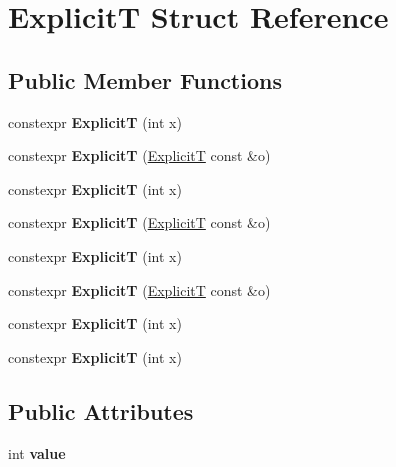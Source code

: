 \hypertarget{struct_explicit_t}{}\section{ExplicitT Struct Reference}
\label{struct_explicit_t}
\subsection*{Public Member Functions}
\begin{DoxyCompactItemize}
\item 
\mbox{\label{struct_explicit_t_a8ebac351427b4b31f50afc5a846a439c}} 
constexpr {\bfseries ExplicitT} (int x)
\item 
\mbox{\label{struct_explicit_t_a9fddccd372d6f78b51484d7e985901f4}} 
constexpr {\bfseries ExplicitT} (\mbox{\hyperlink{struct_explicit_t}{ExplicitT}} const \&o)
\item 
\mbox{\label{struct_explicit_t_a8ebac351427b4b31f50afc5a846a439c}} 
constexpr {\bfseries ExplicitT} (int x)
\item 
\mbox{\label{struct_explicit_t_a9fddccd372d6f78b51484d7e985901f4}} 
constexpr {\bfseries ExplicitT} (\mbox{\hyperlink{struct_explicit_t}{ExplicitT}} const \&o)
\item 
\mbox{\label{struct_explicit_t_a8ebac351427b4b31f50afc5a846a439c}} 
constexpr {\bfseries ExplicitT} (int x)
\item 
\mbox{\label{struct_explicit_t_a9fddccd372d6f78b51484d7e985901f4}} 
constexpr {\bfseries ExplicitT} (\mbox{\hyperlink{struct_explicit_t}{ExplicitT}} const \&o)
\item 
\mbox{\label{struct_explicit_t_a8ebac351427b4b31f50afc5a846a439c}} 
constexpr {\bfseries ExplicitT} (int x)
\item 
\mbox{\label{struct_explicit_t_a8ebac351427b4b31f50afc5a846a439c}} 
constexpr {\bfseries ExplicitT} (int x)
\end{DoxyCompactItemize}
\subsection*{Public Attributes}
\begin{DoxyCompactItemize}
\item 
\mbox{\label{struct_explicit_t_a4057412583a1a28bbd01b2f6b1d654d4}} 
int {\bfseries value}
\end{DoxyCompactItemize}


